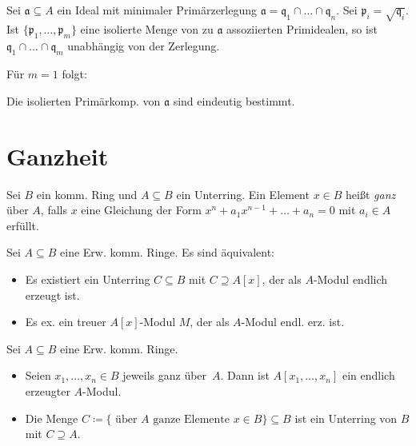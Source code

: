 \documentclass{cheat-sheet}
\newcommand{\aaa}{\mathfrak{a}}
\newcommand{\ppp}{\mathfrak{p}}
\newcommand{\qqq}{\mathfrak{q}}
\begin{document}
\begin{satz}
  Sei $\aaa \subseteq A$ ein Ideal mit minimaler Primärzerlegung $\aaa = \qqq_1 \cap \ldots \cap \qqq_n$.
  Sei $\ppp_i = \sqrt{\qqq_i}$.
  Ist $\{ \ppp_1, \ldots, \ppp_m \}$ eine isolierte Menge von zu $\aaa$ assoziierten Primidealen, so ist $\qqq_1 \cap \ldots \cap \qqq_m$ unabhängig von der Zerlegung.
\end{satz}

Für $m=1$ folgt:

\begin{kor}
  Die isolierten Primärkomp. von $\aaa$ sind eindeutig bestimmt.
\end{kor}

\section{Ganzheit}



\begin{defn}
  Sei $B$ ein komm. Ring und $A \subseteq B$ ein Unterring.
  Ein Element $x \in B$ heißt \emph{ganz} über $A$, falls $x$ eine Gleichung der Form $x^n + a_1 x^{n-1} + \ldots + a_n = 0$ mit $a_i \in A$ erfüllt.
\end{defn}

\begin{prop}
  Sei $A \subseteq B$ eine Erw. komm. Ringe.
  Es sind äquivalent:
  \begin{itemize}
    \item Es existiert ein Unterring $C \subseteq B$ mit $C \supseteq A[x]$, der als $A$-Modul endlich erzeugt ist.
    \item Es ex. ein treuer $A[x]$-Modul $M$, der als $A$-Modul endl. erz. ist.
  \end{itemize}
\end{prop}

\begin{kor}
  Sei $A \subseteq B$ eine Erw. komm. Ringe.
  \begin{itemize}
    \item Seien $x_1, \ldots, x_n \in B$ jeweils ganz über~$A$.
    Dann ist $A[x_1, \ldots, x_n]$ ein endlich erzeugter $A$-Modul.
    \item Die Menge $C \coloneqq \{ \text{ über $A$ ganze Elemente $x \in B$} \} \subseteq B$ ist ein Unterring von $B$ mit $C \supseteq A$.
  \end{itemize}
\end{kor}
\end{document}
